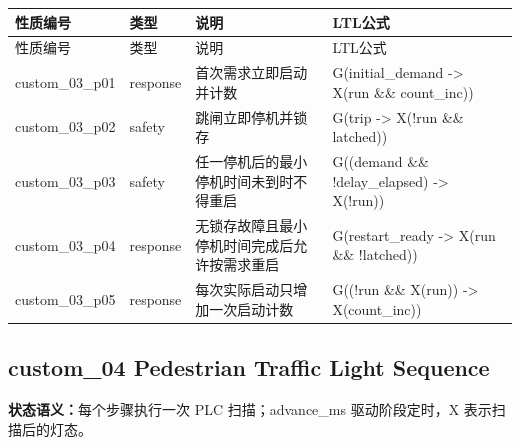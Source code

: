 \begin{longtable}{L{2.3cm}L{1.7cm}L{4.1cm}L{5.2cm}}

\toprule

性质编号 & 类型 & 说明 & LTL公式\\

\midrule

\endfirsthead

\toprule

性质编号 & 类型 & 说明 & LTL公式\\

\midrule

\endhead

{\ttfamily custom\_03\_p01} & response & 首次需求立即启动并计数 & {\ttfamily G(initial\_demand -> X(run \&\& count\_inc))}\\

{\ttfamily custom\_03\_p02} & safety & 跳闸立即停机并锁存 & {\ttfamily G(trip -> X(!run \&\& latched))}\\

{\ttfamily custom\_03\_p03} & safety & 任一停机后的最小停机时间未到时不得重启 & {\ttfamily G((demand \&\& !delay\_elapsed) -> X(!run))}\\

{\ttfamily custom\_03\_p04} & response & 无锁存故障且最小停机时间完成后允许按需求重启 & {\ttfamily G(restart\_ready -> X(run \&\& !latched))}\\

{\ttfamily custom\_03\_p05} & response & 每次实际启动只增加一次启动计数 & {\ttfamily G((!run \&\& X(run)) -> X(count\_inc))}\\

\bottomrule

\end{longtable}

\subsection{{\ttfamily custom\_04} Pedestrian Traffic Light Sequence}

\noindent\textbf{状态语义：}每个步骤执行一次 PLC 扫描；advance\_ms 驱动阶段定时，X 表示扫描后的灯态。

